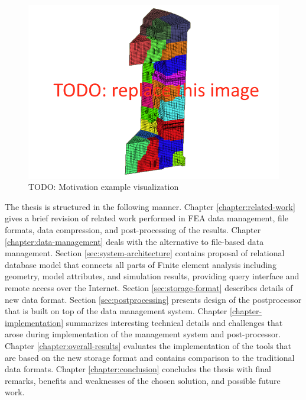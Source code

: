 \begin{figure}[H]
\centering
\includegraphics[width=\textwidth]{figures/chapter-introduction/motivation-example}
\decoRule
\caption[TODO: ]{TODO: Motivation example visualization}
\label{fig:motivation-example}
\end{figure}

The thesis is structured in the following manner. Chapter \ref{chapter:related-work} gives a brief revision of related work performed in FEA data management, file formats, data compression, and post-processing of the results. Chapter \ref{chapter:data-management} deals with the alternative to file-based data management. Section \ref{sec:system-architecture} contains proposal of relational database model that connects all parts of Finite element analysis including geometry, model attributes, and simulation results, providing query interface and remote access over the Internet. Section \ref{sec:storage-format} describes details of new data format. Section \ref{sec:postprocessing} presents design of the postprocessor that is built on top of the data management system. Chapter \ref{chapter-implementation} summarizes interesting technical details and challenges that arose during implementation of the management system and post-processor. Chapter \ref{chapter:overall-results} evaluates the implementation of the tools that are based on the new storage format and contains comparison to the traditional data formats. Chapter \ref{chapter:conclusion} concludes the thesis with final remarks, benefits and weaknesses of the chosen solution, and possible future work.


